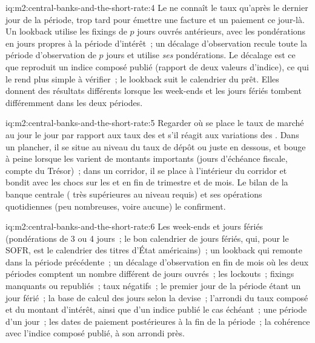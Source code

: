 \begin{solution}{iq:m2:central-banks-and-the-short-rate:4}
Le  ne connaît le taux qu'après le dernier jour de la période,
trop tard pour émettre une facture et un paiement ce jour-là. Un lookback utilise
les fixings de $p$ jours ouvrés antérieurs, avec les pondérations en jours propres à la période
d'intérêt~; un décalage d'observation recule toute la période d'observation de $p$
jours et utilise \emph{ses} pondérations. Le décalage est ce que reproduit un indice composé publié
(rapport de deux valeurs d'indice), ce qui le rend plus simple à vérifier~; le lookback
suit le calendrier du prêt. Elles donnent des résultats différents lorsque les week-ends et les jours fériés
tombent différemment dans les deux périodes.
\end{solution}

\begin{solution}{iq:m2:central-banks-and-the-short-rate:5}
Regarder où se place le taux de marché au jour le jour par rapport aux taux des 
et s'il réagit aux variations des . Dans un plancher, il se situe au niveau du taux de
dépôt ou juste en dessous, et bouge à peine lorsque les  varient de
montants importants (jours d'échéance fiscale, compte du Trésor)~; dans un corridor, il se place à l'intérieur
du corridor et bondit avec les chocs sur les  et en fin de trimestre et de mois.
Le bilan de la banque centrale ( très supérieures au niveau requis) et ses
opérations quotidiennes (peu nombreuses, voire aucune) le confirment.
\end{solution}

\begin{solution}{iq:m2:central-banks-and-the-short-rate:6}
Les week-ends et jours fériés (pondérations de 3 ou 4 jours~; le bon calendrier de jours fériés,
qui, pour le SOFR, est le calendrier des titres d'État américains)~; un lookback qui
remonte dans la période précédente~; un décalage d'observation en fin de mois
où les deux périodes comptent un nombre différent de jours ouvrés~; les lockouts~;
fixings manquants ou republiés~; taux négatifs~; le premier jour de la période étant un
jour férié~; la base de calcul des jours selon la devise~; l'arrondi du taux composé
et du montant d'intérêt, ainsi que d'un indice publié le cas échéant~; une période d'un
jour~; les dates de paiement postérieures à la fin de la période~; la cohérence avec
l'indice composé publié, à son arrondi près.
\end{solution}
